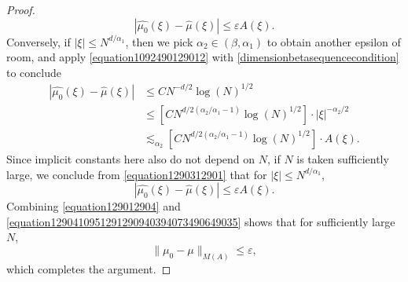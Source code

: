 \documentclass[12pt,reqno]{article}
\numberwithin{equation}{section}
\begin{document}
\begin{proof}
    \begin{equation} \label{equation129012904}
        |\widehat{\mu_0}(\xi) - \widehat{\mu}(\xi)| \leq \varepsilon A(\xi).
    \end{equation}
    Conversely, if $|\xi| \leq N^{d/\alpha_1}$, then we pick $\alpha_2 \in (\beta,\alpha_1)$ to obtain another epsilon of room, and apply \eqref{equation1092490129012} with \eqref{dimensionbetasequencecondition} to conclude
    \begin{equation} \label{equation1290312901}
    \begin{split}
        |\widehat{\mu_0}(\xi) - \widehat{\mu}(\xi)| &\leq C N^{-d/2} \log(N)^{1/2}\\
        &\leq [C N^{d/2(\alpha_2/\alpha_1 - 1)} \log(N)^{1/2}] \cdot |\xi|^{-\alpha_2/2}\\
        &\lesssim_{\alpha_2} [C N^{d/2(\alpha_2/\alpha_1 - 1)} \log(N)^{1/2}] \cdot A(\xi).
    \end{split}
    \end{equation}
    Since implicit constants here also do not depend on $N$, if $N$ is taken sufficiently large, we conclude from \eqref{equation1290312901} that for $|\xi| \leq N^{d/\alpha_1}$,
    \begin{equation} \label{equation1290410951291290940394073490649035}
        |\widehat{\mu_0}(\xi) - \widehat{\mu}(\xi)| \leq \varepsilon A(\xi).
    \end{equation}
    Combining \eqref{equation129012904} and \eqref{equation1290410951291290940394073490649035} shows that for sufficiently large $N$,
    \[ \| \mu_0 - \mu \|_{M(A)} \leq \varepsilon, \]
    which completes the argument.
\end{proof}
\end{document}
